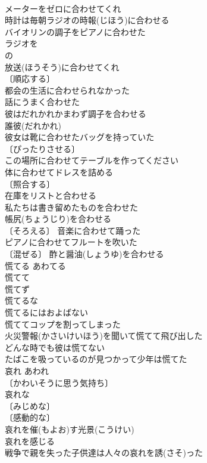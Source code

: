 \documentclass[8pt]{extreport}
\begin{document}
\begin{CJK}{UTF8}{min}
\\	メーターをゼロに合わせてくれ 
\\	時計は毎朝ラジオの時報(じほう)に合わせる 
\\	バイオリンの調子をピアノに合わせた 
\\	ラジオを
\\	の
\\	放送(ほうそう)に合わせてくれ 
\\	〔順応する〕
\\	都会の生活に合わせられなかった 
\\	話にうまく合わせた 
\\	彼はだれかれかまわず調子を合わせる 
\\	誰彼(だれかれ)　
\\	彼女は靴に合わせたバッグを持っていた 
\\	〔ぴったりさせる〕
\\	この場所に合わせてテーブルを作ってください 
\\	体に合わせてドレスを詰める 
\\	〔照合する〕
\\	在庫をリストと合わせる 
\\	私たちは書き留めたものを合わせた 
\\	帳尻(ちょうじり)を合わせる 
\\	〔そろえる〕 音楽に合わせて踊った 
\\	ピアノに合わせてフルートを吹いた 
\\	〔混ぜる〕 酢と醤油(しょうゆ)を合わせる 
\\	慌てる	あわてる	
\\	慌てて 
\\	慌てず 
\\	慌てるな 
\\	慌てるにはおよばない 
\\	慌ててコップを割ってしまった 
\\	火災警報(かさいけいほう)を聞いて慌てて飛び出した 
\\	どんな時でも彼は慌てない 
\\	たばこを吸っているのが見つかって少年は慌てた 
\\	哀れ	あわれ	
\\	〔かわいそうに思う気持ち〕
\\	哀れな 
\\	〔みじめな〕
\\	〔感動的な〕
\\	哀れを催(もよお)す光景(こうけい) 
\\	哀れを感じる 
\\	戦争で親を失った子供達は人々の哀れを誘(さそ)った 

\end{CJK}
\end{document}

